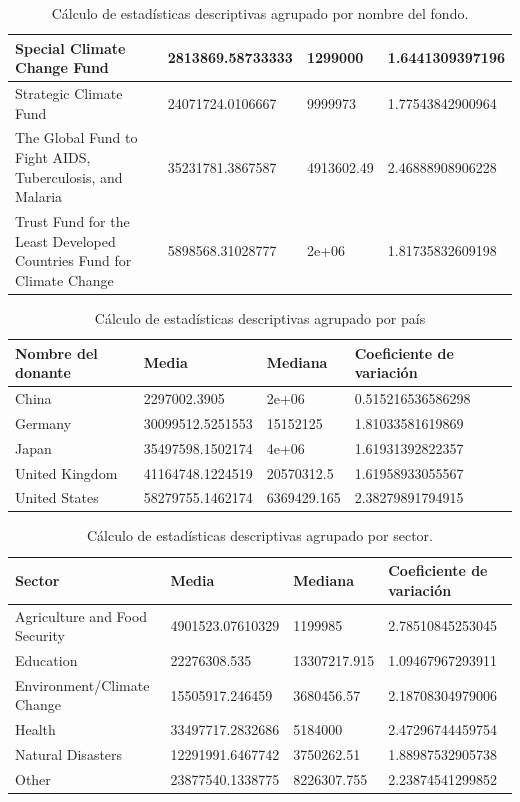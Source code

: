 \documentclass[11pt,letterpaper]{article}
\begin{document}
\begin{table}[t]
\begin{tabular}{|p{3cm}|p{2cm}|p{2cm}|p{2cm}|}
 Special Climate Change Fund & 2813869.58733333 & 1299000 & 1.6441309397196\\ \hline
 Strategic Climate Fund & 24071724.0106667 & 9999973 & 1.77543842900964\\ \hline
 The Global Fund to Fight AIDS, Tuberculosis, and Malaria & 35231781.3867587 & 4913602.49 & 2.46888908906228\\ \hline
Trust Fund for the Least Developed Countries Fund for Climate Change & 5898568.31028777 & 2e+06 & 1.81735832609198\\   \hline
\end{tabular}%
\caption{Cálculo de estadísticas descriptivas agrupado por nombre del fondo.}
\label{tab:table-01}
\end{table}

\begin{table}[t]
\centering
\tiny
\begin{tabular}{|p{3cm}|p{2cm}|p{2cm}|p{2cm}|} \hline
{\sc Nombre del donante} & {\sc Media} & {\sc Mediana} & {\sc Coeficiente de variación}\\ \hline
China & 2297002.3905 & 2e+06 & 0.515216536586298\\ \hline
 Germany & 30099512.5251553 & 15152125 & 1.81033581619869\\ \hline
 Japan & 35497598.1502174 & 4e+06 & 1.61931392822357\\ \hline
 United Kingdom & 41164748.1224519 & 20570312.5 & 1.61958933055567\\ \hline
 United States & 58279755.1462174 & 6369429.165 & 2.38279891794915\\ \hline
\end{tabular}%
\caption{Cálculo de estadísticas descriptivas agrupado por país}
\label{tab:table-02}
\end{table}

\begin{table}[t]
\centering
\tiny
\begin{tabular}{|p{3cm}|p{2cm}|p{2cm}|p{2cm}|} \hline
{\sc Sector} & {\sc Media} & {\sc Mediana} & {\sc Coeficiente de variación}\\ \hline
 Agriculture and Food Security & 4901523.07610329 & 1199985 & 2.78510845253045\\ \hline
 Education & 22276308.535 & 13307217.915 & 1.09467967293911\\ \hline
 Environment/Climate Change & 15505917.246459 & 3680456.57 & 2.18708304979006\\ \hline
 Health & 33497717.2832686 & 5184000 & 2.47296744459754\\ \hline
 Natural Disasters & 12291991.6467742 & 3750262.51 & 1.88987532905738\\ \hline
 Other & 23877540.1338775 & 8226307.755 & 2.23874541299852\\    \hline
\end{tabular}%
\caption{Cálculo de estadísticas descriptivas agrupado por sector.}
\label{tab:table-03}
\end{table}
\end{document}
